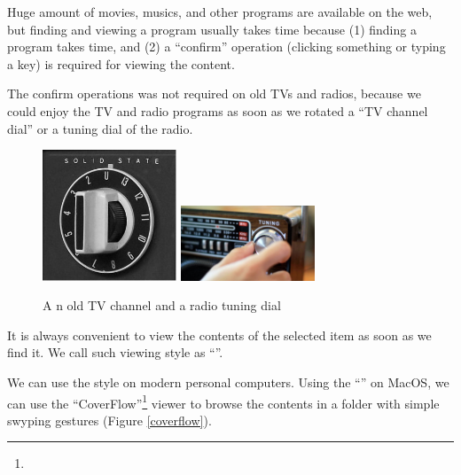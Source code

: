 \documentclass{article}
\begin{document}
% 

Huge amount of movies, musics, and other programs are available on the web, but
finding and viewing a program usually takes time because
(1) finding a program takes time, and
(2) a ``confirm'' operation (clicking something or typing a key)
is required for viewing the content.


The confirm operations was not required on old TVs and radios,
because we could enjoy the TV and radio programs
as soon as we rotated a ``TV channel dial'' or a tuning dial of the radio.

\begin{figure} %
\centerline{
   \includegraphics[width=40mm,bb=0 0 279 272]{figures/9bd96506bdaac48b26c5cd192851c11d.png}
   \includegraphics[width=40mm,bb=0 0 128 72]{figures/fedc4f3c899c48b5a3ddd0982801c79d.png}
}
\caption{A n old TV channel and a radio tuning dial}
\label{TV channel}
\end{figure}



It is always convenient to view the contents of the selected item
as soon as we find it.
We call such viewing style as ``''.

We can use the style on modern personal computers.
Using the ``'' on MacOS, we can use the ``CoverFlow''\footnote{
} viewer to browse the contents in a folder
with simple swyping gestures (Figure \ref{coverflow}).
\end{document}
